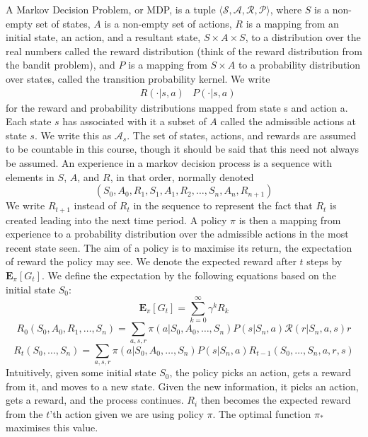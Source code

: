 A Markov Decision Problem, or MDP, is a tuple $\langle \mathcal{S}, \mathcal{A}, \mathcal{R}, \mathcal{P} \rangle$, where $S$ is a non-empty set of states, $A$ is a non-empty set of actions, $R$ is a mapping from an initial state, an action, and a resultant state, $S \times A \times S$, to a distribution over the real numbers called the reward distribution (think of the reward distribution from the bandit problem), and $P$ is a mapping from $S \times A$ to a probability distribution over states, called the transition probability kernel. We write
%
\begin{align*} &R(\cdotp | s, a) &P(\cdotp | s,a) \end{align*}
%
for the reward and probability distributions mapped from state s and action a. Each state $s$ has associated with it a subset of $A$ called the admissible actions at state $s$. We write this as $\mathcal{A}_s$. The set of states, actions, and rewards are assumed to be countable in this course, though it should be said that this need not always be assumed. An experience in a markov decision process is a sequence with elements in $S$, $A$, and $R$, in that order, normally denoted
%
\[ (S_0, A_0, R_1, S_1, A_1, R_2, \dots, S_n, A_n, R_{n+1}) \]
%
We write $R_{t+1}$ instead of $R_t$ in the sequence to represent the fact that $R_t$ is created leading into the next time period. A policy $\pi$ is then a mapping from experience to a probability distribution over the admissible actions in the most recent state seen. The aim of a policy is to maximise its return, the expectation of reward the policy may see. We denote the expected reward after $t$ steps by $\mathbf{E}_\pi[G_t]$. We define the expectation by the following equations based on the initial state $S_0$:
%
\[ \mathbf{E}_\pi[G_t] = \sum_{k = 0}^{\infty} \gamma^k R_k \]
%
\[ R_0(S_0,A_0,R_1,\dots,S_n) = \sum_{a,s,r}\pi(a|S_0,A_0,\dots,S_n) P(s|S_n,a) \mathcal{R}(r|S_n,a,s)r \]
%
\[ R_t(S_0, \dots, S_n) = \sum_{a,s,r}\pi(a|S_0,A_0,\dots,S_n) P(s|S_n,a) R_{t-1}(S_0, \dots, S_n, a, r, s) \]
%
Intuitively, given some initial state $S_0$, the policy picks an action, gets a reward from it, and moves to a new state. Given the new information, it picks an action, gets a reward, and the process continues. $R_i$ then becomes the expected reward from the $t$'th action given we are using policy $\pi$. The optimal function $\pi_*$ maximises this value.





